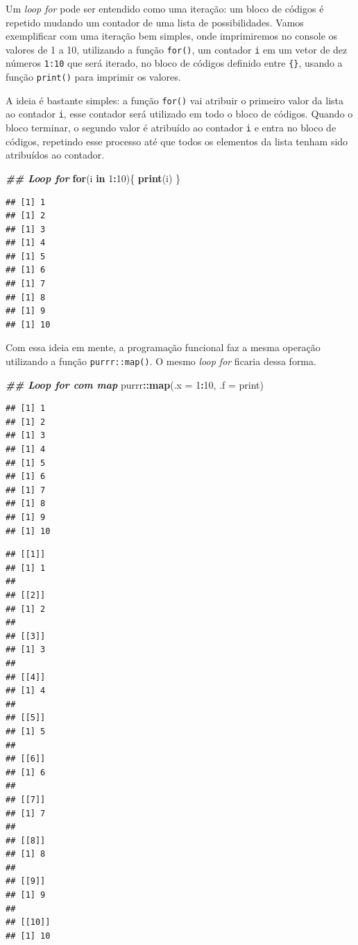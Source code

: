 \documentclass[
]{article}
\newenvironment{Shaded}{\begin{snugshade}}{\end{snugshade}}
\newcommand{\AttributeTok}[1]{\textcolor[rgb]{0.13,0.29,0.53}{#1}}
\newcommand{\ControlFlowTok}[1]{\textcolor[rgb]{0.13,0.29,0.53}{\textbf{#1}}}
\newcommand{\DecValTok}[1]{\textcolor[rgb]{0.00,0.00,0.81}{#1}}
\newcommand{\DocumentationTok}[1]{\textcolor[rgb]{0.56,0.35,0.01}{\textbf{\textit{#1}}}}
\newcommand{\FunctionTok}[1]{\textcolor[rgb]{0.13,0.29,0.53}{\textbf{#1}}}
\newcommand{\NormalTok}[1]{#1}
\newcommand{\SpecialCharTok}[1]{\textcolor[rgb]{0.81,0.36,0.00}{\textbf{#1}}}
\begin{document}
Um \emph{loop for} pode ser entendido como uma iteração: um bloco de códigos é repetido mudando um contador de uma lista de possibilidades. Vamos exemplificar com uma iteração bem simples, onde imprimiremos no console os valores de 1 a 10, utilizando a função \texttt{for()}, um contador \texttt{i} em um vetor de dez números \texttt{1:10} que será iterado, no bloco de códigos definido entre \texttt{\{\}}, usando a função \texttt{print()} para imprimir os valores.

A ideia é bastante simples: a função \texttt{for()} vai atribuir o primeiro valor da lista ao contador \texttt{i}, esse contador será utilizado em todo o bloco de códigos. Quando o bloco terminar, o segundo valor é atribuído ao contador \texttt{i} e entra no bloco de códigos, repetindo esse processo até que todos os elementos da lista tenham sido atribuídos ao contador.

\begin{Shaded}
\begin{Highlighting}[]
\DocumentationTok{\#\# Loop for}
\ControlFlowTok{for}\NormalTok{(i }\ControlFlowTok{in} \DecValTok{1}\SpecialCharTok{:}\DecValTok{10}\NormalTok{)\{}
    \FunctionTok{print}\NormalTok{(i)}
\NormalTok{\}}
\end{Highlighting}
\end{Shaded}

\begin{verbatim}
## [1] 1
## [1] 2
## [1] 3
## [1] 4
## [1] 5
## [1] 6
## [1] 7
## [1] 8
## [1] 9
## [1] 10
\end{verbatim}

Com essa ideia em mente, a programação funcional faz a mesma operação utilizando a função \texttt{purrr::map()}. O mesmo \emph{loop for} ficaria dessa forma.

\begin{Shaded}
\begin{Highlighting}[]
\DocumentationTok{\#\# Loop for com map}
\NormalTok{purrr}\SpecialCharTok{::}\FunctionTok{map}\NormalTok{(}\AttributeTok{.x =} \DecValTok{1}\SpecialCharTok{:}\DecValTok{10}\NormalTok{, }\AttributeTok{.f =}\NormalTok{ print)}
\end{Highlighting}
\end{Shaded}

\begin{verbatim}
## [1] 1
## [1] 2
## [1] 3
## [1] 4
## [1] 5
## [1] 6
## [1] 7
## [1] 8
## [1] 9
## [1] 10
\end{verbatim}

\begin{verbatim}
## [[1]]
## [1] 1
## 
## [[2]]
## [1] 2
## 
## [[3]]
## [1] 3
## 
## [[4]]
## [1] 4
## 
## [[5]]
## [1] 5
## 
## [[6]]
## [1] 6
## 
## [[7]]
## [1] 7
## 
## [[8]]
## [1] 8
## 
## [[9]]
## [1] 9
## 
## [[10]]
## [1] 10
\end{verbatim}
\end{document}
